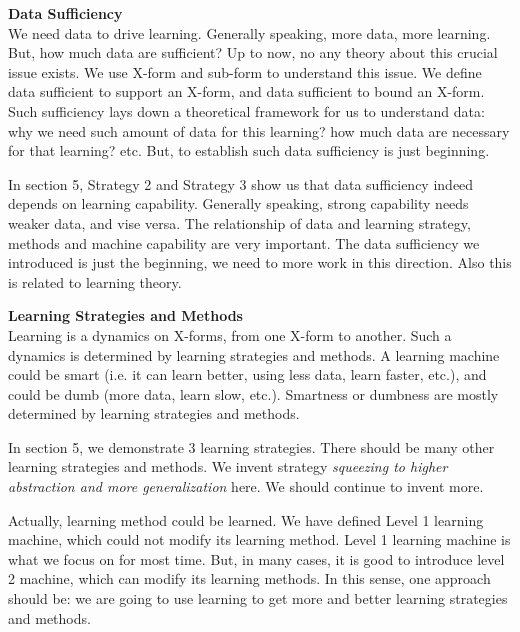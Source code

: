 {\bf Data Sufficiency} \\
We need data to drive learning. Generally speaking, more data, more learning. But, how much data are sufficient? Up to now, no any theory about this crucial issue exists. We use X-form and sub-form to understand this issue. We define data sufficient to support an X-form, and data sufficient to bound an X-form. Such sufficiency lays down a theoretical framework for us to understand data: why we need such amount of data for this learning? how much data are necessary for that learning? etc. But, to establish such data sufficiency is just beginning. 

In section 5, Strategy 2 and Strategy 3 show us that data sufficiency indeed depends on learning capability. Generally speaking, strong capability needs weaker data, and vise versa.  The relationship of data and learning strategy, methods and machine capability are very important. The data sufficiency we introduced is just the beginning, we need to more work in this direction. Also this is related to learning theory. 
\bigskip



{\bf Learning Strategies and Methods } \\
Learning is a dynamics on X-forms, from one X-form to another. Such a dynamics is determined by learning strategies and methods. A learning machine could be smart (i.e. it can learn better, using less data, learn faster, etc.), and could be dumb (more data, learn slow, etc.). Smartness or dumbness are mostly determined by learning strategies and methods. 

In section 5, we demonstrate 3 learning strategies. There should be many other learning strategies and methods. We invent strategy {\it squeezing to higher abstraction and more generalization} here. We should continue to invent more. 

Actually, learning method could be learned. We have defined Level 1 learning machine, which could not modify its learning method. Level 1 learning machine is what we focus on for most time. But, in many cases, it is good to introduce level 2 machine, which can modify its learning methods. In this sense, one approach should be: we are going to use learning to get more and better learning strategies and methods.
\bigskip


